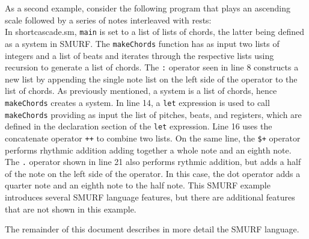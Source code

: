 As a second example, consider the following program that plays an ascending scale followed by a series of notes interleaved with rests:\\



In shortcascade.sm, \texttt{main} is set to a list of lists of chords, the latter being defined as a system in SMURF. The \texttt{makeChords} function has as input two lists of integers and a list of beats and iterates through the respective lists using recursion to generate a list of chords. The \texttt{:} operator seen in line 8 constructs a new list by appending the single note list on the left side of the operator to the list of chords. As previously mentioned, a system is a list of chords, hence \texttt{makeChords} creates a system. In line 14, a \texttt{let} expression is used to call \texttt{makeChords} providing as input the list of pitches, beats, and registers, which are defined in the declaration section of the \texttt{let} expression. Line 16 uses the concatenate operator \texttt{++} to combine two lists. On the same line, the \texttt{\$+} operator performs rhythmic addition adding together a whole note and an eighth note. The \texttt{.} operator shown in line 21 also performs rythmic addition, but adds a half of the note on the left side of the operator. In this case, the dot operator adds a quarter note and an eighth note to the half note.   This SMURF example introduces several SMURF language features, but there are additional features that are not shown in this example. 

The remainder of this document describes in more detail the SMURF language.
